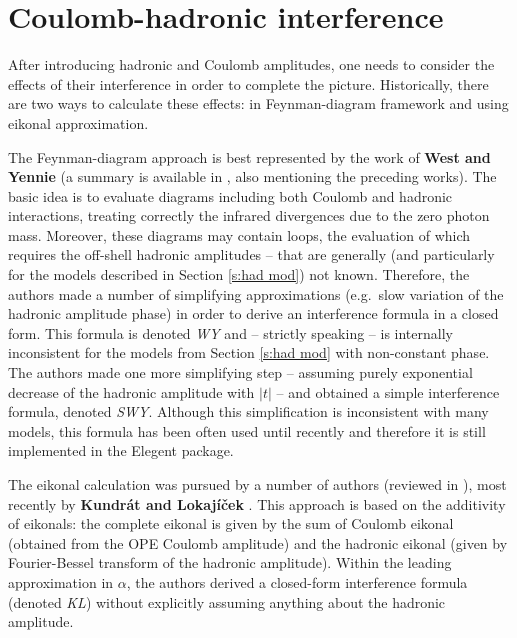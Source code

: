 \documentclass[preprint,12pt]{elsarticle}
\begin{document}

\section{Coulomb-hadronic interference}\label{s:int mod}

After introducing hadronic and Coulomb amplitudes, one needs to consider the effects of their interference in order to complete the picture. Historically, there are two ways to calculate these effects: in Feynman-diagram framework and using eikonal approximation.

The Feynman-diagram approach is best represented by the work of {\bf West and Yennie} \cite{wy68} (a summary is available in \cite[section 1.3.4]{jan_thesis}, also mentioning the preceding works). The basic idea is to evaluate diagrams including both Coulomb and hadronic interactions, treating correctly the infrared divergences due to the zero photon mass. Moreover, these diagrams may contain loops, the evaluation of which requires the off-shell hadronic amplitudes -- that are generally (and particularly for the models described in Section \ref{s:had mod}) not known. Therefore, the authors made a number of simplifying approximations (e.g.~slow variation of the hadronic amplitude phase) in order to derive an interference formula in a closed form. This formula is denoted {\em WY} and -- strictly speaking -- is internally inconsistent for the models from Section \ref{s:had mod} with non-constant phase. The authors made one more simplifying step -- assuming purely exponential decrease of the hadronic amplitude with $|t|$ -- and obtained a simple interference formula, denoted {\em SWY}. Although this simplification is inconsistent with many models, this formula has been often used until recently and therefore it is still implemented in the Elegent package.

The eikonal calculation was pursued by a number of authors (reviewed in \cite[section 1.3.5]{jan_thesis}), most recently by {\bf Kundr\' at and Lokaj\' i\v cek} \cite{kl94}. This approach is based on the additivity of eikonals: the complete eikonal is given by the sum of Coulomb eikonal (obtained from the OPE Coulomb amplitude) and the hadronic eikonal (given by Fourier-Bessel transform of the hadronic amplitude). Within the leading approximation in $\alpha$, the authors derived a closed-form interference formula (denoted {\em KL}) without explicitly assuming anything about the hadronic amplitude.
\end{document}
